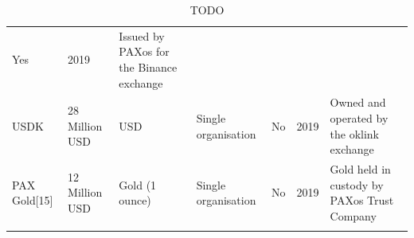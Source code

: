 \documentclass[english,]{IEEEtran}
\begin{document}
\begin{table}[t]
\begin{center}
\begin{supertabular}[]{@{}lllllll@{}}
\begin{minipage}[t]{0.07\textwidth}
Yes\strut
\end{minipage} & \begin{minipage}[t]{0.04\textwidth}\raggedright
2019\strut
\end{minipage} & \begin{minipage}[t]{0.30\textwidth}\raggedright
Issued by PAXos for the Binance exchange\strut
\end{minipage}\tabularnewline
\begin{minipage}[t]{0.14\textwidth}\raggedright
USDK\strut
\end{minipage} & \begin{minipage}[t]{0.08\textwidth}\raggedright
28 Million USD\strut
\end{minipage} & \begin{minipage}[t]{0.07\textwidth}\raggedright
USD\strut
\end{minipage} & \begin{minipage}[t]{0.10\textwidth}\raggedright
Single organisation\strut
\end{minipage} & \begin{minipage}[t]{0.07\textwidth}\raggedright
No\strut
\end{minipage} & \begin{minipage}[t]{0.04\textwidth}\raggedright
2019\strut
\end{minipage} & \begin{minipage}[t]{0.30\textwidth}\raggedright
Owned and operated by the oklink exchange\strut
\end{minipage}\tabularnewline
\begin{minipage}[t]{0.14\textwidth}\raggedright
PAX Gold{[}15{]}\strut
\end{minipage} & \begin{minipage}[t]{0.08\textwidth}\raggedright
12 Million USD\strut
\end{minipage} & \begin{minipage}[t]{0.07\textwidth}\raggedright
Gold (1 ounce)\strut
\end{minipage} & \begin{minipage}[t]{0.10\textwidth}\raggedright
Single organisation\strut
\end{minipage} & \begin{minipage}[t]{0.07\textwidth}\raggedright
No\strut
\end{minipage} & \begin{minipage}[t]{0.04\textwidth}\raggedright
2019\strut
\end{minipage} & \begin{minipage}[t]{0.30\textwidth}\raggedright
Gold held in custody by PAXos Trust Company\strut
\end{minipage}\tabularnewline
\bottomrule
\tabularnewline
\end{supertabular}
\caption{TODO \label{TODO}}
\end{center}\end{table}
\end{document}
